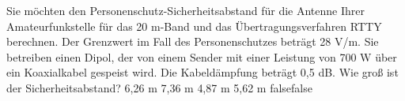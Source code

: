     {Sie möchten den Personenschutz-Sicherheitsabstand für die Antenne Ihrer Amateurfunkstelle für das 20 m-Band und das Übertragungsverfahren RTTY berechnen. Der Grenzwert im Fall des Personenschutzes beträgt 28 V/m. Sie betreiben einen Dipol, der von einem Sender mit einer Leistung von 700 W über ein Koaxialkabel gespeist wird. Die Kabeldämpfung beträgt 0,5 dB. Wie groß ist der Sicherheitsabstand?}
    {6,26 m}
    {7,36 m}
    {4,87 m}
    {5,62 m}
    {false}{false}